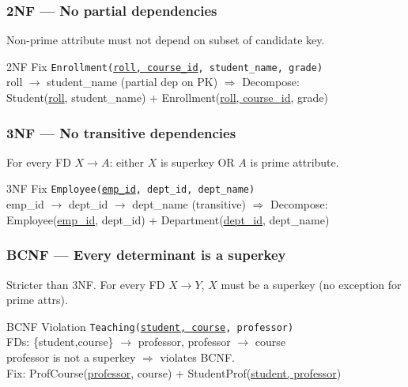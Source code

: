 \documentclass[12pt,a4paper]{article}
\begin{document}
\subsubsection{2NF --- No partial dependencies}
Non-prime attribute must not depend on subset of candidate key.

\begin{examplebox}{2NF Fix}
\texttt{Enrollment(\underline{roll, course\_id}, student\_name, grade)}\\
roll $\to$ student\_name (partial dep on PK) $\Rightarrow$ Decompose:\\
Student(\underline{roll}, student\_name) + Enrollment(\underline{roll, course\_id}, grade)
\end{examplebox}

\subsubsection{3NF --- No transitive dependencies}
For every FD $X \to A$: either $X$ is superkey OR $A$ is prime attribute.

\begin{examplebox}{3NF Fix}
\texttt{Employee(\underline{emp\_id}, dept\_id, dept\_name)}\\
emp\_id $\to$ dept\_id $\to$ dept\_name (transitive) $\Rightarrow$ Decompose:\\
Employee(\underline{emp\_id}, dept\_id) + Department(\underline{dept\_id}, dept\_name)
\end{examplebox}

\subsubsection{BCNF --- Every determinant is a superkey}
Stricter than 3NF. For every FD $X \to Y$, $X$ must be a superkey (no exception for prime attrs).

\begin{examplebox}{BCNF Violation}
\texttt{Teaching(\underline{student, course}, professor)}\\
FDs: \{student,course\} $\to$ professor, professor $\to$ course\\
professor is not a superkey $\Rightarrow$ violates BCNF.\\
Fix: ProfCourse(\underline{professor}, course) + StudentProf(\underline{student, professor})
\end{examplebox}
\end{document}
